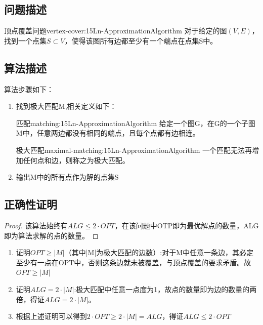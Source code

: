 \subsection{问题描述}

\begin{definition}{顶点覆盖问题}{vertex-cover:15Ln-ApproximationAlgorithm}
	对于给定的图$(V,E)$，找到一个点集$S\subset V$，使得该图所有边都至少有一个端点在点集S中。
\end{definition}

\subsection{算法描述}

算法步骤如下：
\begin{enumerate}
	\item 找到极大匹配M,相关定义如下：
	\begin{definition}{匹配}{matching:15Ln-ApproximationAlgorithm}
		给定一个图G，在G的一个子图M中，任意两边都没有相同的端点，且每个点都有边相连。
	\end{definition}
	\begin{definition}{极大匹配}{maximal-matching:15Ln-ApproximationAlgorithm}
		一个匹配无法再增加任何点和边，则称之为极大匹配。
	\end{definition}
	\item 输出M中的所有点作为解的点集S
\end{enumerate}

\subsection{正确性证明}

\begin{proof}
该算法始终有$ALG\leqslant 2\cdot OPT$，在该问题中OTP即为最优解点的数量，ALG即为算法求解的点的数量。
\end{proof}
\begin{enumerate}
	\item 证明$OPT\geqslant |M|$（其中|M|为极大匹配的边数）:对于M中任意一条边，其必定至少有一点在OPT中，否则这条边就未被覆盖，与顶点覆盖的要求矛盾。故$OPT\geqslant |M|$
	\item 证明$ALG=2\cdot |M|$:极大匹配中任意一点度为1，故点的数量即为边的数量的两倍，得证$ALG=2\cdot |M|$。
	\item 根据上述证明可以得到$2\cdot OPT\geqslant 2\cdot|M|=ALG$，得证$ALG\leqslant 2\cdot OPT$
\end{enumerate}
	
